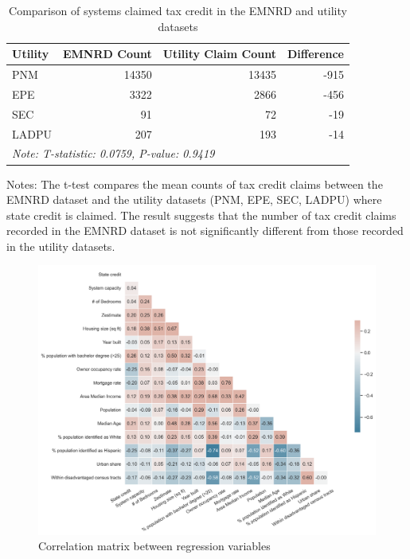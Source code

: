 \documentclass[12pt,twoside,letterpaper]{article}
\begin{document}
\begin{table}[H] 
\caption{Comparison of systems claimed tax credit in the EMNRD and utility datasets}
\label{tab:compare_emnrd_utility}
\centering
\begin{tabular}{lrrr}
\toprule
Utility & EMNRD Count & Utility Claim Count & Difference \\
\midrule
PNM & 14350 & 13435 & -915 \\
EPE & 3322 & 2866 & -456 \\
SEC & 91 & 72 & -19 \\
LADPU & 207 & 193 & -14 \\
\bottomrule
\multicolumn{4}{l}{\textit{Note:  T-statistic: 0.0759, P-value: 0.9419}} \\
\end{tabular}


\begin{flushleft}\footnotesize{Notes: The t-test compares the mean counts of tax credit claims between the EMNRD dataset and the utility datasets (PNM, EPE, SEC, LADPU) where state credit is claimed. The result suggests that the number of tax credit claims recorded in the EMNRD dataset is not significantly different from those recorded in the utility datasets.}
\end{flushleft}
\end{table}

\begin{figure}[H]
    \centering
\includegraphics[width=1\textwidth]{figures/corr_matrix.png}
    \caption{Correlation matrix between regression variables}
    \label{fig:corr_matrix}
\end{figure}
\end{document}
